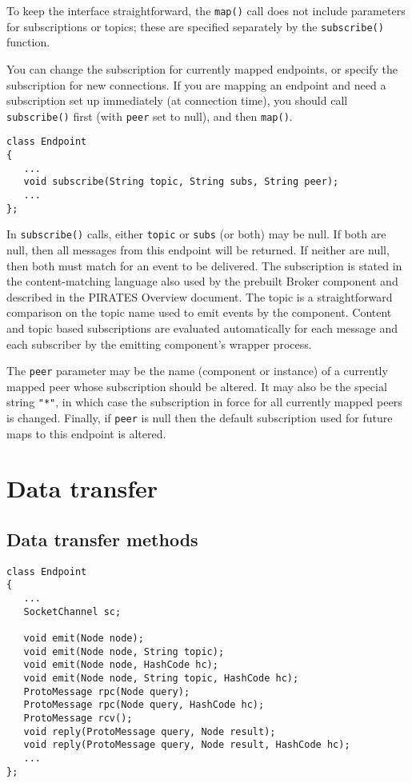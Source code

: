 \documentclass[12pt,a4paper,twoside]{article}
\renewcommand{\_}{\texttt{\symbol{95}}}
\begin{document}
To keep the interface straightforward, the \verb^map()^ call does not
include parameters for subscriptions or topics; these are
specified separately by the \verb^subscribe()^ function.

You can change the subscription for currently mapped endpoints,
or specify the subscription for new connections. If you are
mapping an endpoint and need a subscription set up immediately
(at connection time), you should call \verb^subscribe()^ first
(with \verb^peer^ set to null), and then \verb^map()^.

\begin{verbatim}
class Endpoint
{
   ...
   void subscribe(String topic, String subs, String peer);
   ...
};
\end{verbatim}

In \verb^subscribe()^ calls, either \verb^topic^ or \verb^subs^
(or both) may be null. If both are null, then all messages from this
endpoint will be returned. If neither are null, then both must match
for an event to be delivered. The subscription is stated in the
content-matching language also used by the prebuilt Broker component
and described in the PIRATES Overview document.
The topic is a straightforward comparison on the topic name used to emit
events by the component. Content and topic based subscriptions are evaluated
automatically for each message and each subscriber by the emitting
component's wrapper process.

The \verb^peer^ parameter may be the name (component or instance)
of a currently mapped peer whose subscription should be altered.
It may also be the special string \verb^"*"^, in which case
the subscription in force for all currently mapped peers is changed.
Finally, if \verb^peer^ is null then the default subscription
used for future maps to this endpoint is altered.

\section{Data transfer}

\subsection{Data transfer methods}

\begin{verbatim}
class Endpoint
{
   ...
   SocketChannel sc;
      
   void emit(Node node);
   void emit(Node node, String topic);
   void emit(Node node, HashCode hc);
   void emit(Node node, String topic, HashCode hc);
   ProtoMessage rpc(Node query);
   ProtoMessage rpc(Node query, HashCode hc);
   ProtoMessage rcv();
   void reply(ProtoMessage query, Node result);
   void reply(ProtoMessage query, Node result, HashCode hc);
   ...
};
\end{verbatim}
\end{document}
